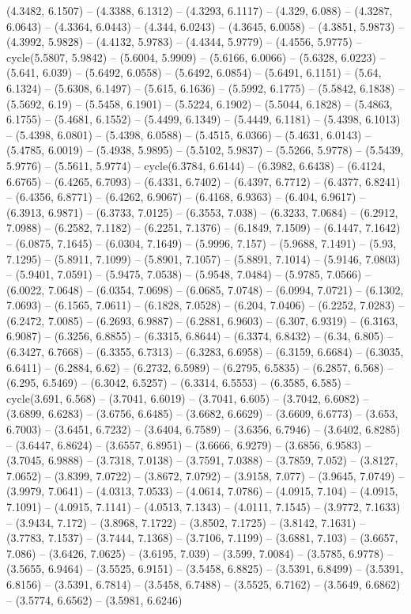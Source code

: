 (4.3482, 6.1507) -- (4.3388, 6.1312) -- (4.3293, 6.1117) -- (4.329, 6.088) -- (4.3287, 6.0643) -- (4.3364, 6.0443) -- (4.344, 6.0243) -- (4.3645, 6.0058) -- (4.3851, 5.9873) -- (4.3992, 5.9828) -- (4.4132, 5.9783) -- (4.4344, 5.9779) -- (4.4556, 5.9775) -- cycle(5.5807, 5.9842) -- (5.6004, 5.9909) -- (5.6166, 6.0066) -- (5.6328, 6.0223) -- (5.641, 6.039) -- (5.6492, 6.0558) -- (5.6492, 6.0854) -- (5.6491, 6.1151) -- (5.64, 6.1324) -- (5.6308, 6.1497) -- (5.615, 6.1636) -- (5.5992, 6.1775) -- (5.5842, 6.1838) -- (5.5692, 6.19) -- (5.5458, 6.1901) -- (5.5224, 6.1902) -- (5.5044, 6.1828) -- (5.4863, 6.1755) -- (5.4681, 6.1552) -- (5.4499, 6.1349) -- (5.4449, 6.1181) -- (5.4398, 6.1013) -- (5.4398, 6.0801) -- (5.4398, 6.0588) -- (5.4515, 6.0366) -- (5.4631, 6.0143) -- (5.4785, 6.0019) -- (5.4938, 5.9895) -- (5.5102, 5.9837) -- (5.5266, 5.9778) -- (5.5439, 5.9776) -- (5.5611, 5.9774) -- cycle(6.3784, 6.6144) -- (6.3982, 6.6438) -- (6.4124, 6.6765) -- (6.4265, 6.7093) -- (6.4331, 6.7402) -- (6.4397, 6.7712) -- (6.4377, 6.8241) -- (6.4356, 6.8771) -- (6.4262, 6.9067) -- (6.4168, 6.9363) -- (6.404, 6.9617) -- (6.3913, 6.9871) -- (6.3733, 7.0125) -- (6.3553, 7.038) -- (6.3233, 7.0684) -- (6.2912, 7.0988) -- (6.2582, 7.1182) -- (6.2251, 7.1376) -- (6.1849, 7.1509) -- (6.1447, 7.1642) -- (6.0875, 7.1645) -- (6.0304, 7.1649) -- (5.9996, 7.157) -- (5.9688, 7.1491) -- (5.93, 7.1295) -- (5.8911, 7.1099) -- (5.8901, 7.1057) -- (5.8891, 7.1014) -- (5.9146, 7.0803) -- (5.9401, 7.0591) -- (5.9475, 7.0538) -- (5.9548, 7.0484) -- (5.9785, 7.0566) -- (6.0022, 7.0648) -- (6.0354, 7.0698) -- (6.0685, 7.0748) -- (6.0994, 7.0721) -- (6.1302, 7.0693) -- (6.1565, 7.0611) -- (6.1828, 7.0528) -- (6.204, 7.0406) -- (6.2252, 7.0283) -- (6.2472, 7.0085) -- (6.2693, 6.9887) -- (6.2881, 6.9603) -- (6.307, 6.9319) -- (6.3163, 6.9087) -- (6.3256, 6.8855) -- (6.3315, 6.8644) -- (6.3374, 6.8432) -- (6.34, 6.805) -- (6.3427, 6.7668) -- (6.3355, 6.7313) -- (6.3283, 6.6958) -- (6.3159, 6.6684) -- (6.3035, 6.6411) -- (6.2884, 6.62) -- (6.2732, 6.5989) -- (6.2795, 6.5835) -- (6.2857, 6.568) -- (6.295, 6.5469) -- (6.3042, 6.5257) -- (6.3314, 6.5553) -- (6.3585, 6.585) -- cycle(3.691, 6.568) -- (3.7041, 6.6019) -- (3.7041, 6.605) -- (3.7042, 6.6082) -- (3.6899, 6.6283) -- (3.6756, 6.6485) -- (3.6682, 6.6629) -- (3.6609, 6.6773) -- (3.653, 6.7003) -- (3.6451, 6.7232) -- (3.6404, 6.7589) -- (3.6356, 6.7946) -- (3.6402, 6.8285) -- (3.6447, 6.8624) -- (3.6557, 6.8951) -- (3.6666, 6.9279) -- (3.6856, 6.9583) -- (3.7045, 6.9888) -- (3.7318, 7.0138) -- (3.7591, 7.0388) -- (3.7859, 7.052) -- (3.8127, 7.0652) -- (3.8399, 7.0722) -- (3.8672, 7.0792) -- (3.9158, 7.077) -- (3.9645, 7.0749) -- (3.9979, 7.0641) -- (4.0313, 7.0533) -- (4.0614, 7.0786) -- (4.0915, 7.104) -- (4.0915, 7.1091) -- (4.0915, 7.1141) -- (4.0513, 7.1343) -- (4.0111, 7.1545) -- (3.9772, 7.1633) -- (3.9434, 7.172) -- (3.8968, 7.1722) -- (3.8502, 7.1725) -- (3.8142, 7.1631) -- (3.7783, 7.1537) -- (3.7444, 7.1368) -- (3.7106, 7.1199) -- (3.6881, 7.103) -- (3.6657, 7.086) -- (3.6426, 7.0625) -- (3.6195, 7.039) -- (3.599, 7.0084) -- (3.5785, 6.9778) -- (3.5655, 6.9464) -- (3.5525, 6.9151) -- (3.5458, 6.8825) -- (3.5391, 6.8499) -- (3.5391, 6.8156) -- (3.5391, 6.7814) -- (3.5458, 6.7488) -- (3.5525, 6.7162) -- (3.5649, 6.6862) -- (3.5774, 6.6562) -- (3.5981, 6.6246) 